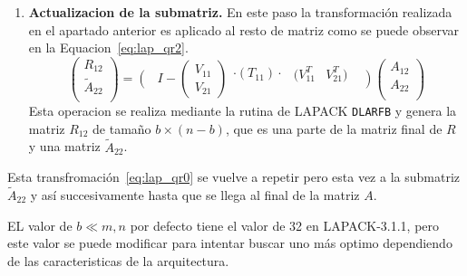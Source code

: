 \documentclass[12pt]{article}
\begin{document}
\begin{enumerate}
\item {\bf Actualizacion de la submatriz.} En este paso la transformación realizada en el apartado anterior es aplicado al resto de matriz como se puede observar en la Equacion~\eqref{eq:lap_qr2}.
  \begin{equation}
    \label{eq:lap_qr2}
    \left(\begin{array}{c}
        R_{12}       \\
        \tilde{A}_{22}\\
      \end{array}\right) =
    \left(\begin{array}{c}
        \\
        \\
      \end{array}\right.  I - \left(\begin{array}{c}
        V_{11} \\
        V_{21}
      \end{array}\right) \begin{array}{c}
      \cdot (T_{11}) \cdot\\
      \\
    \end{array}   \begin{array}{cc}
      (V^T_{11}& V^T_{21}) \\
      &          \\
    \end{array}\left.\begin{array}{c}
        \\
        \\
      \end{array}\right)  \left(\begin{array}{c}
        A_{12}  \\
        A_{22}  \\
      \end{array}\right)
  \end{equation}
    Esta operacion se realiza mediante la rutina de LAPACK \texttt{DLARFB} y genera la matriz $R_{12}$ de tamaño $b \times (n-b)$, que es una parte de la matriz final de $R$ y una matriz $\tilde{A}_{22}$.
\end{enumerate}

Esta transfromación~\eqref{eq:lap_qr0} se vuelve a repetir pero esta vez a la submatriz $\tilde{A}_{22}$ y así succesivamente hasta que se llega al final de la matriz $A$.

EL valor de $b \ll m,n$ por defecto tiene el valor de 32 en LAPACK-3.1.1, pero este valor se puede modificar para intentar buscar uno más optimo dependiendo de las caracteristicas de la arquitectura.
\end{document}
